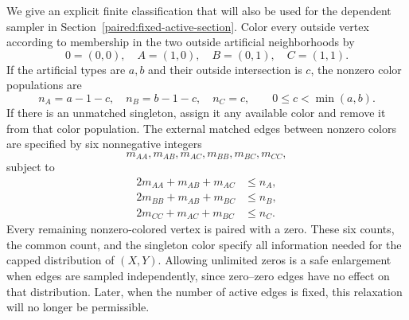 \documentclass[11pt,a4paper]{article}
\theoremstyle{definition}\newtheorem{definition}[theorem]{Definition}
\theoremstyle{remark}\newtheorem{remark}[theorem]{Remark}
\begin{document}
We give an explicit finite classification that will also be used for
the dependent sampler in Section~\ref{paired:fixed-active-section}.
Color every outside vertex according to membership in the two outside
artificial neighborhoods by
\[
 0=(0,0),\quad A=(1,0),\quad B=(0,1),\quad C=(1,1).
\]
If the artificial types are $a,b$ and their outside intersection is
$c$, the nonzero color populations are
\begin{equation}\label{paired:populations}
 n_A=a-1-c,\quad n_B=b-1-c,\quad n_C=c,
 \qquad 0\le c<\min(a,b).
\end{equation}
If there is an unmatched singleton, assign it any available color
and remove it from that color population. The external matched edges
between nonzero colors are specified by six nonnegative integers
\begin{equation}\label{paired:pair-patterns}
 m_{AA},m_{AB},m_{AC},m_{BB},m_{BC},m_{CC},
\end{equation}
subject to
\begin{align*}
 2m_{AA}+m_{AB}+m_{AC}&\le n_A,\\
 2m_{BB}+m_{AB}+m_{BC}&\le n_B,\\
 2m_{CC}+m_{AC}+m_{BC}&\le n_C.
\end{align*}
Every remaining nonzero-colored vertex is paired with a zero. These
six counts, the common count, and the singleton color specify all
information needed for the capped distribution of $(X,Y)$. Allowing
unlimited zeros is a safe enlargement when edges are sampled
independently, since zero--zero edges have no effect on that
distribution. Later, when the number of active edges is fixed, this
relaxation will no longer be permissible.
\end{document}
